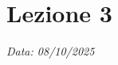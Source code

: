 \chapter{Lezione 3}
\label{chap:lezione_03} 

\begin{flushright}
\textit{Data: 08/10/2025}
\end{flushright}
